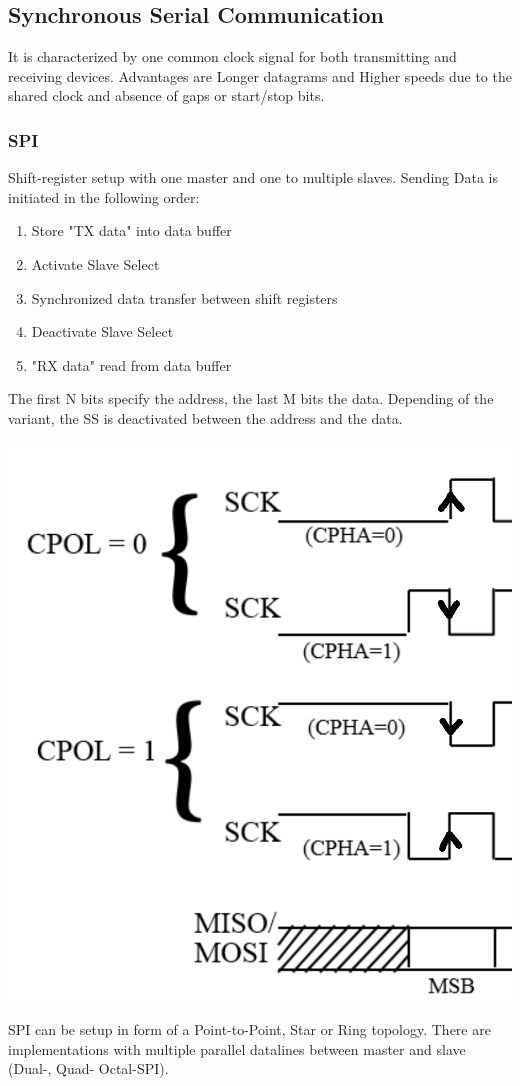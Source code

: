 \subsection{Synchronous Serial Communication }
It is characterized by one common clock signal for both transmitting and receiving devices.
Advantages are Longer datagrams and Higher speeds due to the shared clock and absence of gaps or start/stop bits.


\subsubsection{SPI }
Shift-register setup with one master and one to multiple slaves.
Sending Data is initiated in the following order:
\begin{enumerate}
	\itemsep-.5em 
	\item Store "TX data" into data buffer
	\item Activate Slave Select
	\item Synchronized data transfer between shift registers
	\item Deactivate Slave Select
	\item "RX data" read from data buffer
\end{enumerate}
The first N bits specify the address, the last M bits the data. Depending of the variant, the SS is deactivated between the address and the data.

\begin{center}
	\includegraphics[width=.5\columnwidth]{"Images/SPI_Clock_modes.png"}
\end{center}

SPI can be setup in form of a Point-to-Point, Star or Ring topology.
There are implementations with multiple parallel datalines between master and slave (Dual-, Quad- Octal-SPI).


